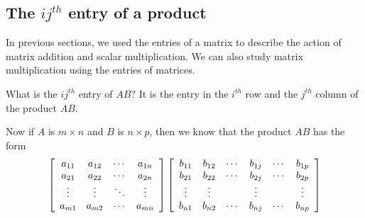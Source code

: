 \subsection{The \texorpdfstring{$ij^{th}$}{ijth} entry of a product}

In previous sections, we used the entries of a matrix to describe the action of matrix addition and scalar multiplication.
We can also study matrix multiplication using the entries of matrices. 

What is the $ij^{th}$ entry of $AB?$ It is the entry in the $i^{th}$ row
and the $j^{th}$ column of the product $AB$. 
 
Now if $A$ is $m \times n$ and $B$ is $n \times p$, then we know that the product $AB$ has the form 
\begin{equation*}
\left[
\begin{array}{cccc}
a_{11} & a_{12} & \cdots & a_{1n} \\
a_{21} & a_{22} & \cdots & a_{2n} \\
\vdots & \vdots &  \ddots & \vdots \\
a_{m1} & a_{m2} & \cdots & a_{mn}
\end{array}
\right] \left[
\begin{array}{cccccc}
b_{11} & b_{12} & \cdots & b_{1j} & \cdots & b_{1p} \\
b_{21} & b_{22} & \cdots & b_{2j} & \cdots & b_{2p} \\
\vdots & \vdots &  & \vdots & & \vdots\\
b_{n1} & b_{n2} & \cdots & b_{nj} & \cdots & b_{np}
\end{array}
\right] 
\end{equation*}

